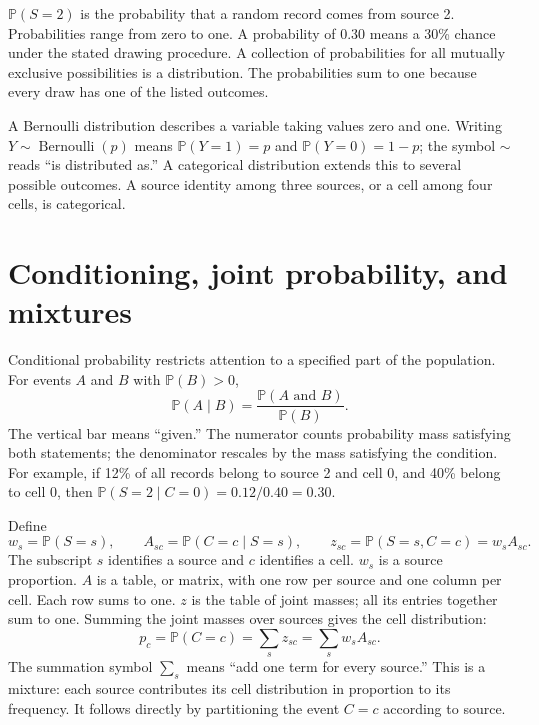 \documentclass[11pt,a4paper]{report}
\newcommand{\Prob}{\mathbb P}
\newcommand{\Bern}{\operatorname{Bernoulli}}
\begin{document}
$\Prob(S=2)$ is the probability that a random record comes from source 2. Probabilities range from zero to one. A probability of $0.30$ means a 30\% chance under the stated drawing procedure. A collection of probabilities for all mutually exclusive possibilities is a distribution. The probabilities sum to one because every draw has one of the listed outcomes.

A Bernoulli distribution describes a variable taking values zero and one. Writing $Y\sim\Bern(p)$ means $\Prob(Y=1)=p$ and $\Prob(Y=0)=1-p$; the symbol $\sim$ reads ``is distributed as.'' A categorical distribution extends this to several possible outcomes. A source identity among three sources, or a cell among four cells, is categorical.

\section{Conditioning, joint probability, and mixtures}
Conditional probability restricts attention to a specified part of the population. For events $A$ and $B$ with $\Prob(B)>0$,
\begin{equation}
\Prob(A\mid B)=\frac{\Prob(A\text{ and }B)}{\Prob(B)}.
\end{equation}
The vertical bar means ``given.'' The numerator counts probability mass satisfying both statements; the denominator rescales by the mass satisfying the condition. For example, if 12\% of all records belong to source 2 and cell 0, and 40\% belong to cell 0, then $\Prob(S=2\mid C=0)=0.12/0.40=0.30$.

Define
\begin{equation}
w_s=\Prob(S=s),\qquad A_{sc}=\Prob(C=c\mid S=s),\qquad z_{sc}=\Prob(S=s,C=c)=w_sA_{sc}.
\label{eq:mass}
\end{equation}
The subscript $s$ identifies a source and $c$ identifies a cell. $w_s$ is a source proportion. $A$ is a table, or matrix, with one row per source and one column per cell. Each row sums to one. $z$ is the table of joint masses; all its entries together sum to one. Summing the joint masses over sources gives the cell distribution:
\begin{equation}
p_c=\Prob(C=c)=\sum_s z_{sc}=\sum_s w_sA_{sc}.
\label{eq:mixture}
\end{equation}
The summation symbol $\sum_s$ means ``add one term for every source.'' This is a mixture: each source contributes its cell distribution in proportion to its frequency. It follows directly by partitioning the event $C=c$ according to source.
\end{document}
